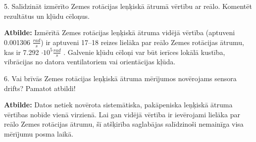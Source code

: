 \documentclass[12pt]{article}
\newlength\tindent
\renewcommand{\indent}{\hspace*{\tindent}}
\begin{document}
5.	Salīdzināt izmērīto Zemes rotācijas leņķiskā ātrumā vērtību ar reālo. Komentēt rezultātus un kļūdu cēloņus.

\indent \textbf{Atbilde:} Izmērītā Zemes rotācijas leņķiskā ātruma vidējā vērtība (aptuveni 0.001306 $\frac{rad}{s}$) ir aptuveni 17–18 reizes lielāka par reālo Zemes rotācijas ātrumu, kas ir 7.292 $\cdot 10^5 \frac{rad}{s}$ \cite{earth_rotation_velocity}. Galvenie kļūdu cēloņi var būt ierīces lokālā kustība, vibrācijas no datora ventilatoriem vai orientācijas kļūda.

6.	Vai brīvās Zemes rotācijas leņķiskā ātruma mērījumos novērojams sensora drifts? Pamatot atbildi!

\indent \textbf{Atbilde:} Datos netiek novērota sistemātiska, pakāpeniska leņķiskā ātruma vērtības nobīde vienā virzienā. Lai gan vidējā vērtība ir ievērojami lielāka par reālo Zemes rotācijas ātrumu, šī atšķirība saglabājas salīdzinoši nemainīga visa mērījumu posma laikā.
\end{document}
